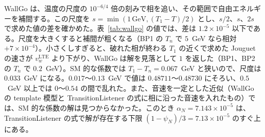 \documentclass[a4paper,10pt]{ltjsarticle}
\begin{document}
WallGo は、温度の尺度の $10^{-6/4}$ 倍の刻みで相を追い、その範囲で自由エネルギーを補間する。この尺度を $s=\min(1\,\mathrm{GeV},(T_1-T)/2)$ とし、$s/2$、$s$、$2s$ で求めた値の差を確かめた。表~\ref{tab:wallgo} の値では、差は $1.2\times10^{-5}$ 以下である。尺度を大きくすると補間が粗くなる（BP1 の $T_n$ で $5$~GeV なら相対 $+7\times10^{-4}$）。小さくしすぎると、破れた相が終わる $T_1$ の近くで求めた Jouguet の速さが $v_w^{\mathrm{LTE}}$ より下がり、WallGo は解を見落として $1$ を返した（BP1、BP2 の $T_n$ で $0.2$~GeV）。SM 的な係数では $T_1-T_n=0.067$~GeV と狭いので、尺度は $0.033$~GeV になる。$0.017$〜$0.13$~GeV で値は $0.48711$〜$0.48730$ にそろい、$0.5$~GeV 以上では $0$〜$0.54$ の間で乱れた。また、音速を一定とした近似（WallGo の template 模型と TransitionListener の式に相に沿った音速を入れたもの）では、SM 的な係数の解は見つからなかった。このとき $\alpha_N=7.143\times10^{-5}$ は、TransitionListener の式で解が存在する下限 $(1-\psi_N)/3=7.13\times10^{-5}$ のすぐ上にある。
\end{document}
